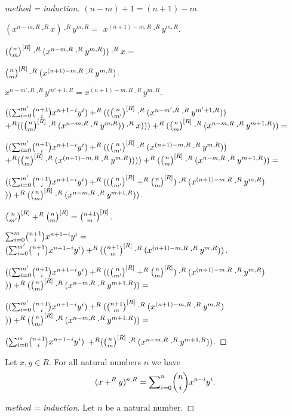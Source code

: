 \documentclass[english,11pt]{article}
\begin{document}
\begin{forthel}
\begin{proof}[method = induction]
$(n - m) + 1 = (n + 1) - m$.

$(x^{n - m,R} \cdot^{R} x) \cdot^{R} y^{m,R} =$
$x^{(n+1)-m,R} \cdot^{R} y^{m,R}$.

$(\cho{n}{m}^{[R]} \cdot^{R} (x^{n - m,R} \cdot^{R} y^{m,R})) \cdot^{R} x = $

$\cho{n}{m}^{[R]} \cdot^{R} (x^{(n+1) - m,R} \cdot^{R} y^{m,R})$.

$x^{n-m',R} \cdot^{R} y^{m'+1,R} = x^{(n+1)-m,R} \cdot^{R} y^{m,R}.$

$ ((\binsum{m'}{n+1}{x}{y}{R}) +^{R} ((\cho{n}{m'}^{[R]} \cdot^{R} (x^{n-m',R} \cdot^{R} y^{m'+1,R})) $
$ +^{R} 
((\cho{n}{m}^{[R]} \cdot^{R} (x^{n - m,R} \cdot^{R} y^{m,R})) \cdot^{R} x)))
   +^{R} (\cho{n}{m}^{[R]} \cdot^{R} (x^{n - m,R} \cdot^{R} y^{m+1,R})) = $

$ ((\binsum{m'}{n+1}{x}{y}{R}) +^{R} ((\cho{n}{m'}^{[R]} \cdot^{R} (x^{(n+1)-m,R} \cdot^{R} y^{m,R})) $
$ +^{R} 
(\cho{n}{m}^{[R]} \cdot^{R} (x^{(n+1) - m,R} \cdot^{R} y^{m,R}))))
   +^{R} (\cho{n}{m}^{[R]} \cdot^{R} (x^{n - m,R} \cdot^{R} y^{m+1,R})) =$

$ ((\binsum{m'}{n+1}{x}{y}{R}) +^{R} ((\cho{n}{m'}^{[R]} +^{R}  \cho{n}{m}^{[R]} )\cdot^{R} (x^{(n+1)-m,R} \cdot^{R} y^{m,R}) $
$  ))
   +^{R} (\cho{n}{m}^{[R]} \cdot^{R} (x^{n - m,R} \cdot^{R} y^{m+1,R})) $.

$\cho{n}{m'}^{[R]} +^{R}  \cho{n}{m}^{[R]} = \cho{n+1}{m}^{[R]}$.



$ \binsum{m}{n+1}{x}{y}{R} =$
$(\binsum{m'}{n+1}{x}{y}{R}) +^{R} (\cho{n+1}{m}^{[R]} \cdot^{R} (x^{(n+1)-m,R} \cdot^{R} y^{m,R}))$.



$ ((\binsum{m'}{n+1}{x}{y}{R}) +^{R} ((\cho{n}{m'}^{[R]} +^{R}  \cho{n}{m}^{[R]} )\cdot^{R} (x^{(n+1)-m,R} \cdot^{R} y^{m,R}) $
$  ))
   +^{R} (\cho{n}{m}^{[R]} \cdot^{R} (x^{n - m,R} \cdot^{R} y^{m+1,R})) =$


$ ((\binsum{m'}{n+1}{x}{y}{R}) +^{R} (\cho{n+1}{m}^{[R]} \cdot^{R} (x^{(n+1)-m,R} \cdot^{R} y^{m,R}) $
$  ))
   +^{R} (\cho{n}{m}^{[R]} \cdot^{R} (x^{n - m,R} \cdot^{R} y^{m+1,R})) =$

$ (\binsum{m}{n+1}{x}{y}{R}) $
$  +^{R} (\cho{n}{m}^{[R]} \cdot^{R} (x^{n - m,R} \cdot^{R} y^{m+1,R})) $.




\end{proof}

\begin{theorem}
Let $x,y \in R$. For all natural numbers $n$ we have
\[(x +^{R} y)^{n,R} = \binsum{n}{n}{x}{y}{R}.\]
\end{theorem}
\begin{proof}[method = induction]
Let $n$ be a natural number.


\end{proof}
\end{forthel}
\end{document}
